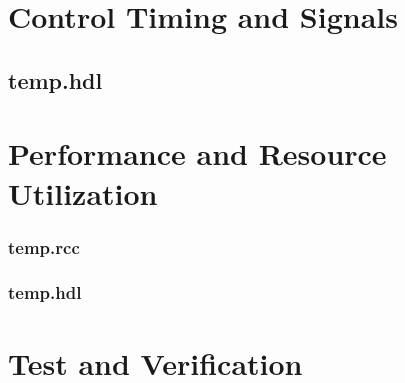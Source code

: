 \documentclass{article}
\def\comp{temp}
\begin{document}
\section*{Control Timing and Signals}
\subsection*{\comp.hdl}
\begin{flushleft}
\end{flushleft}

\section*{Performance and Resource Utilization}
\subsubsection*{\comp.rcc}
\subsubsection*{\comp.hdl}


\section*{Test and Verification}
\begin{flushleft}
\end{flushleft}
\end{document}
